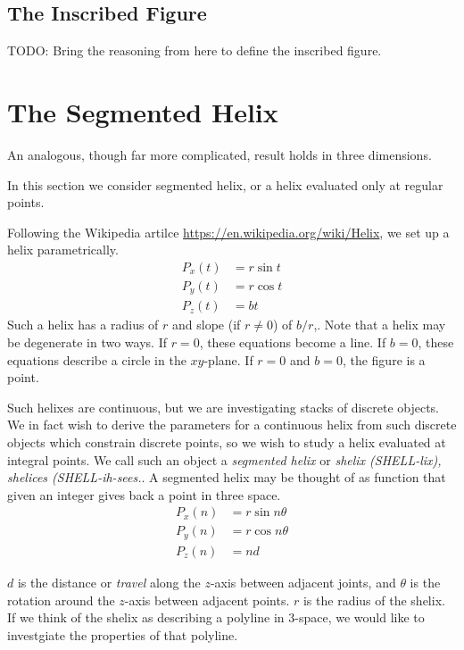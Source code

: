 \documentclass[11pt]{article}
\begin{document}
{\subsection{The Inscribed Figure}

TODO: Bring the reasoning from \cite{read2018transforming} here to define the inscribed figure.


\label{sec:2d}
\section{The Segmented Helix}

An analogous, though far more complicated, result holds in three dimensions.

In this section we consider segmented helix, or a helix evaluated only at regular points. 

Following the Wikipedia artilce \url{https://en.wikipedia.org/wiki/Helix}, we set up a helix parametrically.
\begin{align*}
    P_x(t) &= r \sin{t}  \\
    P_y(t) &= r \cos{t} \\
   P_z(t) &= b t
\end{align*}
Such a helix has a radius of $r$ and slope (if $r \neq 0$) of $b/r$,. Note that a helix may be degenerate in two ways.
If $r = 0$, these equations become a line. If $b = 0$, these equations describe a circle in the $xy$-plane.
If $r = 0$ and $b = 0$, the figure is a point.

Such helixes are continuous, but we are investigating stacks of discrete objects. We in fact wish to derive
the parameters for a continuous helix from such discrete objects which constrain discrete points, so we wish
to study a helix evaluated at integral points. We call such an object a {\em segmented helix} or {\em shelix (SHELL-lix), shelices (SHELL-ih-sees.}.
A segmented helix may be thought of as function that given an integer gives back a point in three space.
\begin{align*}
    P_x(n) &= r \sin{n \theta}  \\
    P_y(n) &= r \cos{n \theta} \\
   P_z(n) &= n d
\end{align*}

$d$ is the distance or {\em travel} along the $z$-axis between adjacent joints, and $\theta$ is the rotation around the $z$-axis
between adjacent points. $r$ is the radius of the shelix. If we think of the shelix as describing a polyline in 3-space, we would like to investgiate
the properties of that polyline.

}
\end{document}
